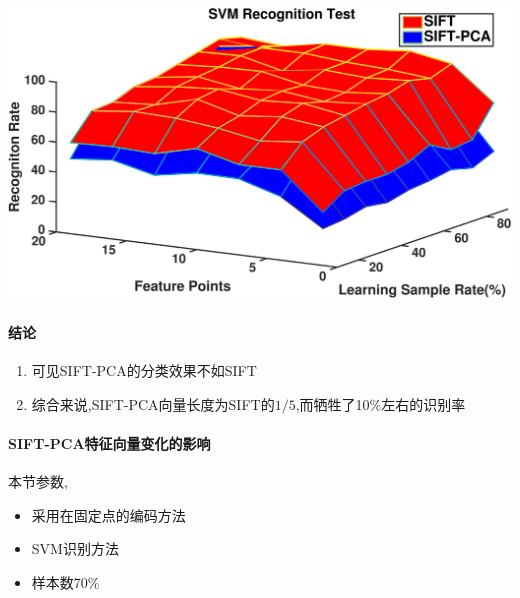 		\begin{center}
		\begin{minipage}[t]{\linewidth}
		\center
		{
		\includegraphics[width=\textwidth]{Img/c3/sift_sift_pca_svm} 
		}
		\end{minipage}
		\medskip
		\end{center}
	
\paragraph{结论}
\begin{enumerate}
	\item 可见SIFT-PCA的分类效果不如SIFT
	\item 综合来说,SIFT-PCA向量长度为SIFT的$1/5$,而牺牲了10\%左右的识别率
\end{enumerate}

\paragraph{SIFT-PCA特征向量变化的影响}
本节参数,
\begin{itemize}
	\item 采用在固定点的编码方法
	\item SVM识别方法
	\item 样本数70\%
\end{itemize}

